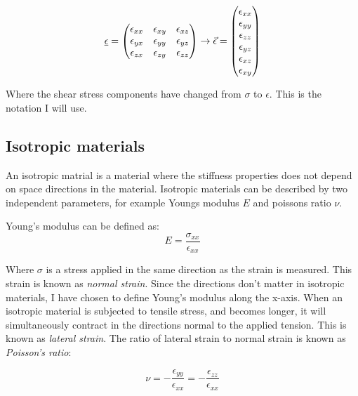 \begin{equation}
	\uline{\epsilon} = 
	\begin{pmatrix}
	\epsilon_{xx} & \epsilon_{xy} & \epsilon_{xz} \\
	\epsilon_{yx} & \epsilon_{yy} & \epsilon_{yz} \\
	\epsilon_{zx} & \epsilon_{zy} & \epsilon_{zz} \\ 
	\end{pmatrix}
	\to 
	\vec{\epsilon} = 
	\begin{pmatrix}
	\epsilon_{xx} \\ \epsilon_{yy} \\ \epsilon_{zz} \\ \epsilon_{yz} \\ \epsilon_{xz} \\ \epsilon_{xy}
	\end{pmatrix}
\end{equation}

Where the shear stress components have changed from $\sigma$ to $\epsilon$. This is the notation I will use.

\subsection{Isotropic materials}
An isotropic matrial is a material where the stiffness properties does not depend on space directions in the material. Isotropic materials can be described by two independent parameters, for example Youngs modulus $E$ and poissons ratio $\nu$. 

Young's modulus can be defined as:
\begin{equation}
	E = \frac{\sigma_{xx}}{\epsilon_{xx}}
\end{equation}

Where $\sigma$ is a stress applied in the same direction as the strain is measured. This strain is known as \emph{normal strain}. Since the directions don't matter in isotropic materials, I have chosen to define Young's modulus along the x-axis. When an isotropic material is subjected to tensile stress, and becomes longer, it will simultaneously contract in the directions normal to the applied tension. This is known as \emph{lateral strain}. The ratio of lateral strain to normal strain is known as \emph{Poisson's ratio}:

\begin{equation}
	\nu = -\frac{\epsilon_{yy}}{\epsilon_{xx}} = -\frac{\epsilon_{zz}}{\epsilon_{xx}}
\end{equation}

